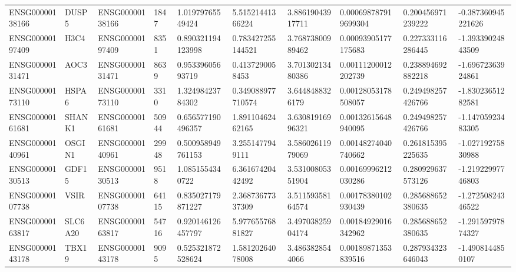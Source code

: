 \begin{tabular}{@{}llllllllll@{}}
ENSG00000138166 & DUSP5 & ENSG00000138166 & 1847 & 1.01979765549424 & 5.51521441366224 & 3.88619043917711 & 0.000698787919699304 & 0.200456971239222 & -0.387360945221626 \\
ENSG00000197409 & H3C4 & ENSG00000197409 & 8351 & 0.890321194123998 & 0.783427255144521 & 3.76873800989462 & 0.00093905177175683 & 0.227333116286445 & -1.39339024843509 \\
ENSG00000131471 & AOC3 & ENSG00000131471 & 8639 & 0.95339605693719 & 0.4137290058453 & 3.70130213480386 & 0.00111200012202739 & 0.238894692882218 & -1.69672363924861 \\
ENSG00000173110 & HSPA6 & ENSG00000173110 & 3310 & 1.32498423784302 & 0.349088977710574 & 3.6448488326179 & 0.00128053178508057 & 0.249498257426766 & -1.83023651282581 \\
ENSG00000161681 & SHANK1 & ENSG00000161681 & 50944 & 0.656577190496357 & 1.89110462462165 & 3.63081916996321 & 0.00132615648940095 & 0.249498257426766 & -1.14705923483305 \\
ENSG00000140961 & OSGIN1 & ENSG00000140961 & 29948 & 0.500958949761153 & 3.2551477949111 & 3.58602611979069 & 0.00148274040740662 & 0.261815395225635 & -1.02719275830988 \\
ENSG00000130513 & GDF15 & ENSG00000130513 & 9518 & 1.0851554340722 & 6.36167420442492 & 3.53100805351904 & 0.00169996212030286 & 0.280929637573126 & -1.21922997746803 \\
ENSG00000107738 & VSIR & ENSG00000107738 & 64115 & 0.835027179871227 & 2.36873677337309 & 3.51159358164574 & 0.00178380102930439 & 0.285688652380635 & -1.27250824346522 \\
ENSG00000163817 & SLC6A20 & ENSG00000163817 & 54716 & 0.920146126457797 & 5.97765576881827 & 3.49703825904174 & 0.00184929016342962 & 0.285688652380635 & -1.29159797874327 \\
ENSG00000143178 & TBX19 & ENSG00000143178 & 9095 & 0.525321872528624 & 1.58120264078008 & 3.4863828544066 & 0.00189871353839516 & 0.287934323646043 & -1.4908144850107 \\
\bottomrule
\end{tabular}
\endgroup
